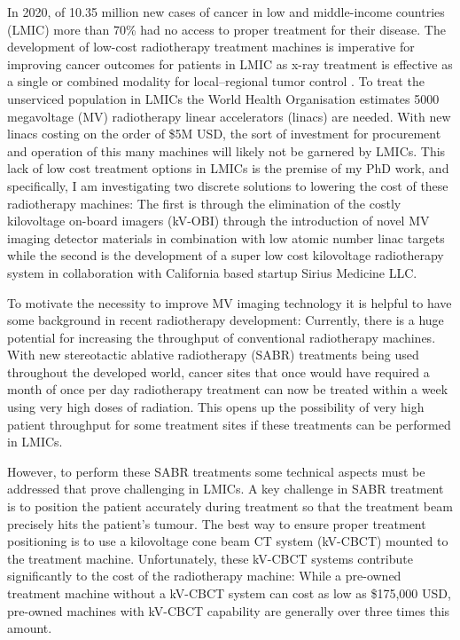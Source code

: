 \label{chapter:introduction}

In 2020, of 10.35 million new cases of cancer in low and middle-income countries (LMIC) more than 70\% had no access to proper treatment for their disease\cite{CancerCountries/}. The development of low-cost radiotherapy treatment machines is imperative for improving cancer outcomes for patients in LMIC as x-ray treatment is effective as a single or combined modality for local–regional tumor control \cite{UN2012,WorldhealthOrganization2018WHODiseases}. To treat the unserviced population in LMICs the World Health Organisation estimates 5000 megavoltage (MV) radiotherapy linear accelerators (linacs) are needed\cite{Samiei2013ChallengesCountries}. With new linacs costing on the order of \$5M USD, the sort of investment for procurement and operation of this many machines will likely not be garnered by LMICs. This lack of low cost treatment options in LMICs is the premise of my PhD work, and specifically, I am investigating two discrete solutions to lowering the cost of these radiotherapy machines: The first is through the elimination of the costly kilovoltage on-board imagers (kV-OBI) through the introduction of novel MV imaging detector materials in combination with low atomic number linac targets while the second is the development of a super low cost kilovoltage radiotherapy system in collaboration with California based startup Sirius Medicine LLC.

To motivate the necessity to improve MV imaging technology it is helpful to have some background in recent radiotherapy development: Currently, there is a huge potential for increasing the throughput of conventional radiotherapy machines. With new stereotactic ablative radiotherapy (SABR) treatments being used throughout the developed world\cite{ClaridgeMackonis2020StereotacticNSW,Palma2019StereotacticTrial,Palma2020StereotacticTrial,Billiet2020OutcomeOligometastases,Li2020RadiobiologyOncologists}, cancer sites that once would have required a month of once per day radiotherapy treatment can now be treated within a week using very high doses of radiation. This opens up the possibility of very high patient throughput for some treatment sites if these treatments can be performed in LMICs\cite{Asher2019PracticalWorld}. 

However, to perform these SABR treatments some technical aspects must be addressed that prove challenging in LMICs. A key challenge in SABR treatment is to position the patient accurately during treatment so that the treatment beam precisely hits the patient's tumour\cite{Mesko2020EstimatingAccuracy,Wang2016ImprovedCancer}. The best way to ensure proper treatment positioning is to use a kilovoltage cone beam CT system (kV-CBCT) mounted to the treatment machine. Unfortunately, these kV-CBCT systems contribute significantly to the cost of the radiotherapy machine: While a pre-owned treatment machine without a kV-CBCT system can cost as low as \$175,000 USD, pre-owned machines with kV-CBCT capability are generally over three times this amount\cite{2021Linear/resources/linear-accelerator-guides/used-linac-price}.

